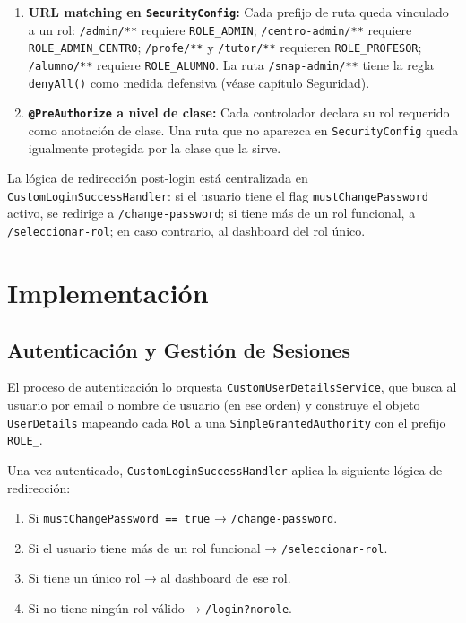 \documentclass[12pt, a4paper]{report}
\begin{document}
\begin{enumerate}
  \item \textbf{URL matching en \texttt{SecurityConfig}:} Cada prefijo de ruta
        queda vinculado a un rol:
        \texttt{/admin/**} requiere \texttt{ROLE\_ADMIN};
        \texttt{/centro-admin/**} requiere \texttt{ROLE\_ADMIN\_CENTRO};
        \texttt{/profe/**} y \texttt{/tutor/**} requieren \texttt{ROLE\_PROFESOR};
        \texttt{/alumno/**} requiere \texttt{ROLE\_ALUMNO}.
        La ruta \texttt{/snap-admin/**} tiene la regla \texttt{denyAll()} como
        medida defensiva (véase capítulo Seguridad).
  \item \textbf{\texttt{@PreAuthorize} a nivel de clase:} Cada controlador declara
        su rol requerido como anotación de clase. Una ruta que no aparezca en
        \texttt{SecurityConfig} queda igualmente protegida por la clase que la
        sirve.
\end{enumerate}

La lógica de redirección post-login está centralizada en
\texttt{CustomLoginSuccessHandler}: si el usuario tiene el flag
\texttt{mustChangePassword} activo, se redirige a \texttt{/change-password};
si tiene más de un rol funcional, a \texttt{/seleccionar-rol}; en caso contrario,
al dashboard del rol único.

\chapter{Implementación}

\section{Autenticación y Gestión de Sesiones}

El proceso de autenticación lo orquesta \texttt{CustomUserDetailsService}, que
busca al usuario por email o nombre de usuario (en ese orden) y construye el objeto
\texttt{UserDetails} mapeando cada \texttt{Rol} a una
\texttt{SimpleGrantedAuthority} con el prefijo \texttt{ROLE\_}.

Una vez autenticado, \texttt{CustomLoginSuccessHandler} aplica la siguiente lógica
de redirección:

\begin{enumerate}
  \item Si \texttt{mustChangePassword == true} → \texttt{/change-password}.
  \item Si el usuario tiene más de un rol funcional → \texttt{/seleccionar-rol}.
  \item Si tiene un único rol → al dashboard de ese rol.
  \item Si no tiene ningún rol válido → \texttt{/login?norole}.
\end{enumerate}
\end{document}
